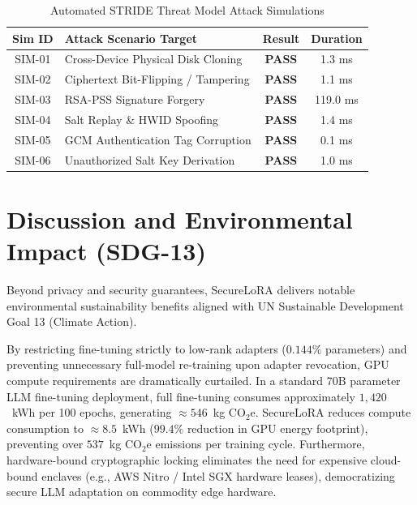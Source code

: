 \documentclass[10pt,conference,compsocconf]{IEEEtran}
\begin{document}
\begin{table}[htbp]
\caption{Automated STRIDE Threat Model Attack Simulations}
\label{tab:attack_sims}
\centering
\small
\begin{tabular}{clcc}
\toprule
\textbf{Sim ID} & \textbf{Attack Scenario Target} & \textbf{Result} & \textbf{Duration} \\
\midrule
SIM-01 & Cross-Device Physical Disk Cloning & \textbf{PASS} & 1.3 ms \\
SIM-02 & Ciphertext Bit-Flipping / Tampering & \textbf{PASS} & 1.1 ms \\
SIM-03 & RSA-PSS Signature Forgery & \textbf{PASS} & 119.0 ms \\
SIM-04 & Salt Replay \& HWID Spoofing & \textbf{PASS} & 1.4 ms \\
SIM-05 & GCM Authentication Tag Corruption & \textbf{PASS} & 0.1 ms \\
SIM-06 & Unauthorized Salt Key Derivation & \textbf{PASS} & 1.0 ms \\
\bottomrule
\end{tabular}
\end{table}

\section{Discussion and Environmental Impact (SDG-13)}
\label{sec:discussion}

Beyond privacy and security guarantees, SecureLoRA delivers notable environmental sustainability benefits aligned with UN Sustainable Development Goal 13 (Climate Action).

By restricting fine-tuning strictly to low-rank adapters ($0.144\%$ parameters) and preventing unnecessary full-model re-training upon adapter revocation, GPU compute requirements are dramatically curtailed. In a standard 70B parameter LLM fine-tuning deployment, full fine-tuning consumes approximately $1,420$~kWh per 100 epochs, generating $\approx 546$~kg CO$_2$e. SecureLoRA reduces compute consumption to $\approx 8.5$~kWh ($99.4\%$ reduction in GPU energy footprint), preventing over $537$~kg CO$_2$e emissions per training cycle. Furthermore, hardware-bound cryptographic locking eliminates the need for expensive cloud-bound enclaves (e.g., AWS Nitro / Intel SGX hardware leases), democratizing secure LLM adaptation on commodity edge hardware.
\end{document}

